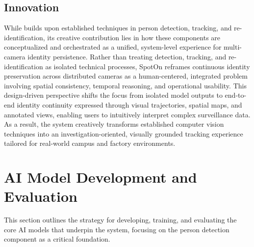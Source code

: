 \subsection{Innovation}
\label{subsection:innovation_aic}
While \usevar{\srsTitle} builds upon established techniques in person detection, tracking, and re-identification, its creative contribution lies in how these components are conceptualized and orchestrated as a unified, system-level experience for multi-camera identity persistence. Rather than treating detection, tracking, and re-identification as isolated technical processes, SpotOn reframes continuous identity preservation across distributed cameras as a human-centered, integrated problem involving spatial consistency, temporal reasoning, and operational usability. This design-driven perspective shifts the focus from isolated model outputs to end-to-end identity continuity expressed through visual trajectories, spatial maps, and annotated views, enabling users to intuitively interpret complex surveillance data. As a result, the system creatively transforms established computer vision techniques into an investigation-oriented, visually grounded tracking experience tailored for real-world campus and factory environments.

\section{AI Model Development and Evaluation}
\label{section:ai_model_dev_eval_new}
This section outlines the strategy for developing, training, and evaluating the core AI models that underpin the \usevar{\srsTitle} system, focusing on the person detection component as a critical foundation.

